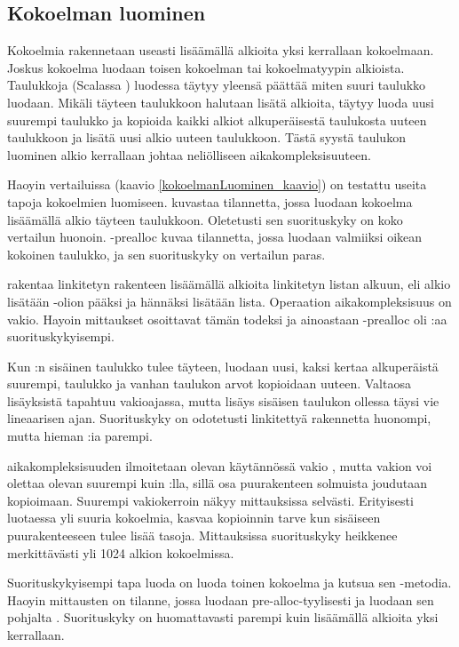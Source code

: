 \subsection{Kokoelman luominen}
Kokoelmia rakennetaan useasti lisäämällä alkioita yksi kerrallaan kokoelmaan. Joskus kokoelma luodaan toisen kokoelman tai kokoelmatyypin alkioista. Taulukkoja (Scalassa ) luodessa täytyy yleensä päättää miten suuri taulukko luodaan. Mikäli täyteen taulukkoon halutaan lisätä alkioita, täytyy luoda uusi suurempi taulukko ja kopioida kaikki alkiot alkuperäisestä taulukosta uuteen taulukkoon ja lisätä uusi alkio uuteen taulukkoon. Tästä syystä taulukon luominen alkio kerrallaan johtaa neliölliseen aikakompleksisuuteen.

Haoyin vertailuissa\cite{haoyiBenchmark} (kaavio \ref{kokoelmanLuominen_kaavio}) on testattu useita tapoja kokoelmien luomiseen.  kuvastaa tilannetta, jossa luodaan kokoelma lisäämällä alkio täyteen taulukkoon. Oletetusti sen suorituskyky on koko vertailun huonoin. -prealloc kuvaa tilannetta, jossa luodaan valmiiksi oikean kokoinen taulukko, ja sen suorituskyky on vertailun paras.

 rakentaa linkitetyn rakenteen lisäämällä alkioita linkitetyn listan alkuun, eli alkio lisätään \code{::}-olion pääksi ja hännäksi lisätään lista. Operaation aikakompleksisuus on vakio. \cite{scalaCollections} Hayoin mittaukset osoittavat tämän todeksi ja ainoastaan -prealloc oli :aa suorituskykyisempi.

Kun :n sisäinen taulukko tulee täyteen, luodaan uusi, kaksi kertaa alkuperäistä suurempi, taulukko ja vanhan taulukon arvot kopioidaan uuteen. Valtaosa lisäyksistä tapahtuu vakioajassa, mutta lisäys sisäisen taulukon ollessa täysi vie lineaarisen ajan. Suorituskyky on odotetusti linkitettyä rakennetta huonompi, mutta hieman :ia parempi.

 aikakompleksisuuden ilmoitetaan olevan käytännössä vakio \cite{scalaCollections}, mutta vakion voi olettaa olevan suurempi kuin :lla, sillä osa puurakenteen solmuista joudutaan kopioimaan.  Suurempi vakiokerroin näkyy mittauksissa selvästi. Erityisesti luotaessa yli suuria kokoelmia, kasvaa kopioinnin tarve kun sisäiseen puurakenteeseen tulee  lisää tasoja. Mittauksissa suorituskyky heikkenee merkittävästi yli 1024 alkion kokoelmissa.

Suorituskykyisempi tapa luoda  on luoda toinen kokoelma ja kutsua sen -metodia. Haoyin\cite{haoyiBenchmark} mittausten  on tilanne, jossa luodaan  pre-alloc-tyylisesti ja luodaan sen pohjalta . Suorituskyky on huomattavasti parempi kuin lisäämällä alkioita yksi kerrallaan.

